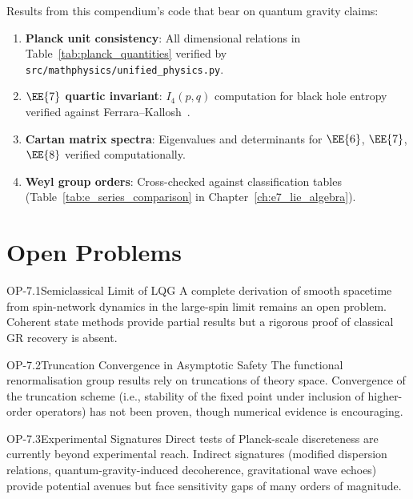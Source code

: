 Results from this compendium's code that bear on quantum gravity claims:
\begin{enumerate}
    \item \textbf{Planck unit consistency}: All dimensional relations in
          Table~\ref{tab:planck_quantities} verified by
          \texttt{src/mathphysics/unified\_physics.py}.
    \item \textbf{$\EE{7}$ quartic invariant}: $I_4(p,q)$ computation
          for black hole entropy verified against
          Ferrara--Kallosh~\cite{ferrara1997}.
    \item \textbf{Cartan matrix spectra}: Eigenvalues and determinants
          for $\EE{6}$, $\EE{7}$, $\EE{8}$ verified computationally.
    \item \textbf{Weyl group orders}: Cross-checked against classification
          tables (Table~\ref{tab:e_series_comparison} in
          Chapter~\ref{ch:e7_lie_algebra}).
\end{enumerate}

\section{Open Problems}
\label{sec:qg_open}

\begin{openproblem}{OP-7.1}{Semiclassical Limit of LQG}
A complete derivation of smooth spacetime from spin-network dynamics in
the large-spin limit remains an open problem.  Coherent state methods
provide partial results but a rigorous proof of classical GR recovery is
absent.
\end{openproblem}

\begin{openproblem}{OP-7.2}{Truncation Convergence in Asymptotic Safety}
The functional renormalisation group results rely on truncations of
theory space.  Convergence of the truncation scheme (i.e., stability of
the fixed point under inclusion of higher-order operators) has not been
proven, though numerical evidence is encouraging.
\end{openproblem}

\begin{openproblem}{OP-7.3}{Experimental Signatures}
Direct tests of Planck-scale discreteness are currently beyond
experimental reach.  Indirect signatures (modified dispersion relations,
quantum-gravity-induced decoherence, gravitational wave echoes) provide
potential avenues but face sensitivity gaps of many orders of magnitude.
\end{openproblem}

